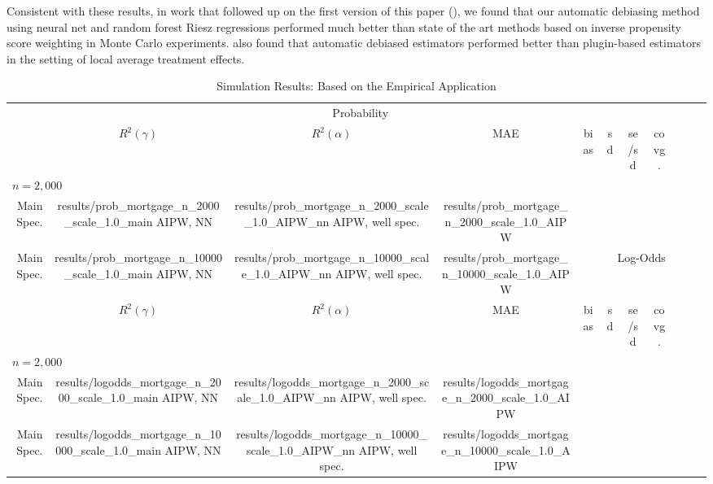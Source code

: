 \documentclass[aos]{imsart}
\makeatletter
\numberwithin{equation}{section}
\theoremstyle{plain}
\theoremstyle{remark}
\newcommand\tableinput[1]{\@@input #1 }
\makeatother
\begin{document}
Consistent with these results, in work that followed up on the first version of this paper (\cite{chernozhukov2022riesznet}), we found that our automatic debiasing method using neural net and random forest Riesz regressions performed much better than state of the art methods based on inverse propensity score weighting in Monte Carlo experiments. \cite{singh2023double} also found that automatic debiased estimators performed better than plugin-based estimators in the setting of local average treatment effects.

\begin{table}[] \centering
    \caption{Simulation Results: Based on the Empirical Application}
    \label{tab:simul1}
    \begin{tabular}{r*{7}{c}}
    \toprule
    & \multicolumn{7}{c}{Probability} \\
    \cmidrule(r){2-8}
    & $R^2(\gamma)$ & $R^2(\alpha)$ & MAE & bias & sd & se/sd & covg. \\
    \midrule
    \multicolumn{8}{l}{$n = 2,000$} \\
    Main Spec. & \tableinput{results/prob_mortgage_n_2000_scale_1.0_main}
    AIPW, NN & \tableinput{results/prob_mortgage_n_2000_scale_1.0_AIPW_nn}
    AIPW, well spec. & \tableinput{results/prob_mortgage_n_2000_scale_1.0_AIPW}
    \addlinespace
    \multicolumn{8}{l}{$n = 10,000$} \\
    Main Spec. & \tableinput{results/prob_mortgage_n_10000_scale_1.0_main}
    AIPW, NN & \tableinput{results/prob_mortgage_n_10000_scale_1.0_AIPW_nn}
    AIPW, well spec. & \tableinput{results/prob_mortgage_n_10000_scale_1.0_AIPW}

    \addlinespace
    \midrule
    & \multicolumn{7}{c}{Log-Odds} \\
    \cmidrule(r){2-8}
    & $R^2(\gamma)$ & $R^2(\alpha)$ & MAE & bias & sd & se/sd & covg. \\
    \midrule
    \multicolumn{8}{l}{$n = 2,000$} \\
    Main Spec. & \tableinput{results/logodds_mortgage_n_2000_scale_1.0_main}
    AIPW, NN & \tableinput{results/logodds_mortgage_n_2000_scale_1.0_AIPW_nn}
    AIPW, well spec. &\tableinput{results/logodds_mortgage_n_2000_scale_1.0_AIPW}
    \addlinespace
    \multicolumn{8}{l}{$n = 10,000$} \\
    Main Spec. & \tableinput{results/logodds_mortgage_n_10000_scale_1.0_main}
    AIPW, NN & \tableinput{results/logodds_mortgage_n_10000_scale_1.0_AIPW_nn}
    AIPW, well spec. &\tableinput{results/logodds_mortgage_n_10000_scale_1.0_AIPW}
    

\end{tabular}
\end{table}
\end{document}
